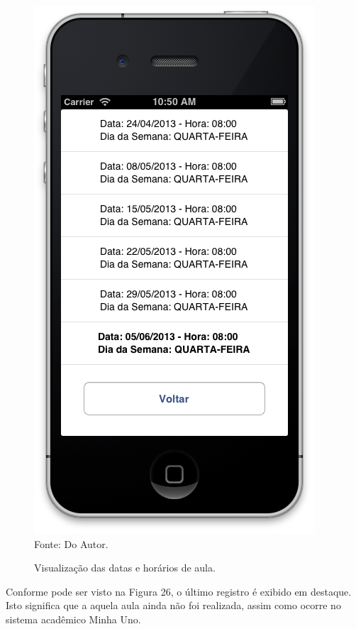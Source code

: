 \begin{figure}[!htb]
     \centering
     \caption[Formulário Horários do Semestre - Visualização dos Horários]{Visualização das datas e horários de aula.}
     \includegraphics[scale=0.34]{imagens/formconsultahorariosemestredisciplina.png}
     \\  Fonte: Do Autor.
\end{figure}
\newpage

Conforme pode ser visto na Figura 26, o último registro é exibido em destaque. Isto significa que a aquela aula ainda não foi realizada, assim como ocorre no sistema acadêmico Minha Uno.

